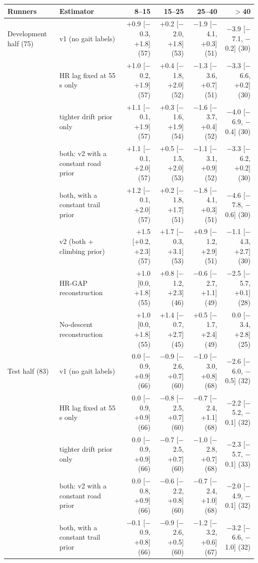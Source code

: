 \begin{tabular}{@{}llrrrr@{}}
\toprule
Runners & Estimator & 8--15 & 15--25 & 25--40 & $>$40 \\
\midrule
Development half (75) & \ascent{} v1 (no gait labels) & +0.9 [$-$0.3, +1.8] (57) & +0.2 [$-$2.0, +1.8] (53) & $-$1.9 [$-$4.1, +0.3] (51) & $-$3.9 [$-$7.1, $-$0.2] (30) \\
 & \quad HR lag fixed at 55 s only & +1.0 [$-$0.2, +1.9] (57) & +0.4 [$-$1.8, +2.0] (52) & $-$1.3 [$-$3.6, +0.7] (51) & $-$3.3 [$-$6.6, +0.2] (30) \\
 & \quad tighter drift prior only & +1.1 [$-$0.1, +1.9] (57) & +0.3 [$-$1.6, +1.9] (54) & $-$1.6 [$-$3.7, +0.4] (52) & $-$4.0 [$-$6.9, $-$0.4] (30) \\
 & \quad both: v2 with a constant road prior & +1.1 [$-$0.1, +2.0] (57) & +0.5 [$-$1.5, +2.0] (53) & $-$1.1 [$-$3.1, +0.9] (52) & $-$3.3 [$-$6.2, +0.2] (30) \\
 & \quad both, with a constant trail prior & +1.2 [$-$0.1, +2.0] (57) & +0.2 [$-$1.8, +1.7] (51) & $-$1.8 [$-$4.1, +0.3] (51) & $-$4.6 [$-$7.8, $-$0.6] (30) \\
 & \ascent{} v2 (both + climbing prior) & +1.5 [+0.2, +2.3] (57) & +1.7 [$-$0.3, +3.1] (53) & +0.9 [$-$1.2, +2.9] (51) & $-$1.1 [$-$4.3, +2.7] (30) \\
 & HR-GAP reconstruction & +1.0 [0.0, +1.8] (55) & +0.8 [$-$1.2, +2.3] (46) & $-$0.6 [$-$2.7, +1.1] (49) & $-$2.5 [$-$5.7, +0.1] (28) \\
 & No-descent reconstruction & +1.0 [0.0, +1.8] (55) & +1.4 [$-$0.7, +2.7] (45) & +0.5 [$-$1.7, +2.4] (49) & 0.0 [$-$3.4, +2.8] (25) \\
\addlinespace[2pt]
Test half (83) & \ascent{} v1 (no gait labels) & 0.0 [$-$0.9, +0.9] (66) & $-$0.9 [$-$2.6, +0.7] (60) & $-$1.0 [$-$3.0, +0.8] (68) & $-$2.6 [$-$6.0, $-$0.5] (32) \\
 & \quad HR lag fixed at 55 s only & 0.0 [$-$0.9, +0.9] (66) & $-$0.8 [$-$2.5, +0.7] (60) & $-$0.7 [$-$2.4, +1.1] (68) & $-$2.2 [$-$5.2, $-$0.1] (32) \\
 & \quad tighter drift prior only & 0.0 [$-$0.9, +0.9] (66) & $-$0.7 [$-$2.5, +0.7] (60) & $-$1.0 [$-$2.8, +0.7] (68) & $-$2.3 [$-$5.7, $-$0.1] (33) \\
 & \quad both: v2 with a constant road prior & 0.0 [$-$0.8, +0.9] (66) & $-$0.6 [$-$2.2, +0.8] (60) & $-$0.7 [$-$2.4, +1.0] (68) & $-$2.0 [$-$4.9, $-$0.1] (32) \\
 & \quad both, with a constant trail prior & $-$0.1 [$-$0.9, +0.8] (66) & $-$0.9 [$-$2.6, +0.5] (60) & $-$1.2 [$-$3.2, +0.6] (67) & $-$3.2 [$-$6.6, $-$1.0] (32) \\

\end{tabular}

